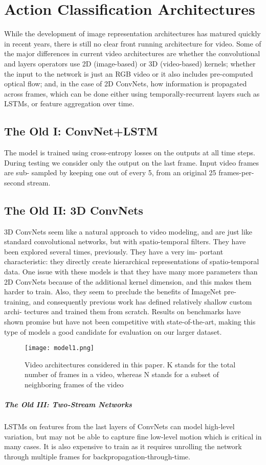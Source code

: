 \documentclass[10pt,twocolumn,letterpaper]{article}
\begin{document}
\section{Action Classification Architectures}
While the development of image representation architectures has matured quickly in recent years, there is still no clear front running architecture for video. Some of the major differences in current video architectures are whether the convolutional and layers operators use 2D (image-based) or
3D (video-based) kernels; whether the input to the network is just an RGB video or it also includes pre-computed optical flow; and, in the case of 2D ConvNets, how information  is propagated across frames, which can be done either using temporally-recurrent layers such as LSTMs, or feature
aggregation over time.
\subsection{The Old I: ConvNet+LSTM}
The model is trained using cross-entropy losses on the
outputs at all time steps. During testing we consider only
the output on the last frame. Input video frames are sub-
sampled by keeping one out of every 5, from an original 25
frames-per-second stream.
\subsection{The Old II: 3D ConvNets}
3D ConvNets seem like a natural approach to video modeling, and are just like standard convolutional networks, but with spatio-temporal filters. They have been explored several times, previously. They have a very im-
portant characteristic: they directly create hierarchical representations of spatio-temporal data. One issue with these models is that they have many more parameters than 2D ConvNets because of the additional kernel dimension, and this makes them harder to train. Also, they seem to preclude
the benefits of ImageNet pre-training, and consequently
previous work has defined relatively shallow custom archi-
tectures and trained them from scratch. Results on benchmarks have shown promise but have not been competitive with state-of-the-art, making this type of models a good candidate for evaluation on our larger dataset.
  \begin{figure}[!htb]
  	\centering
  	\texttt{[image: model1.png]}\\
  	\caption{Video architectures considered in this paper. K stands for the total number of frames in a video, whereas N stands for a subset of
  		neighboring frames of the video}\label{Figure1}
  \end{figure}
\subparagraph{The Old III: Two-Stream Networks}
LSTMs on features from the last layers of ConvNets can model high-level variation, but may not be able to capture fine low-level motion which is critical in many cases. It is also expensive to train as it requires unrolling the network through multiple frames for backpropagation-through-time.
\end{document}
